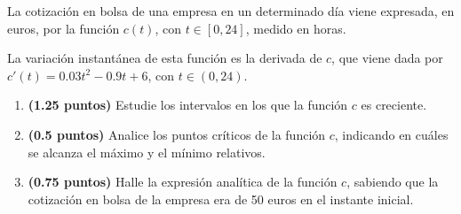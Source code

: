 
La cotización en bolsa de una empresa en un determinado día viene expresada,
en euros, por la función $c(t)$, con $t\in[0,24]$, medido en horas.

La variación instantánea de esta función es la derivada de $c$, que viene dada
por $c'(t)=0.03t^2-0.9t+6$, con $t\in(0,24)$.
\begin{enumerate}[label=\alph*)]
  \item \textbf{(1.25 puntos)} Estudie los intervalos en los que la función
  $c$ es creciente.
  \item \textbf{(0.5 puntos)} Analice los puntos críticos de la función $c$,
  indicando en cuáles se alcanza el máximo y el mínimo relativos.
  \item \textbf{(0.75 puntos)} Halle la expresión analítica de la función
  $c$, sabiendo que la cotización en bolsa de la empresa era de 50 euros
  en el instante inicial.
\end{enumerate}
